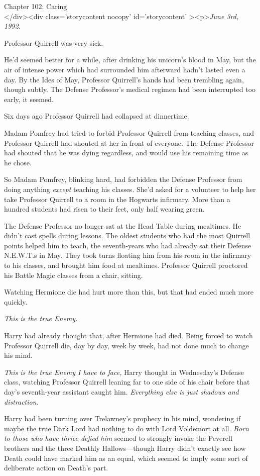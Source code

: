 
Chapter 102: Caring\\
</div><div  class='storycontent nocopy' id='storycontent' ><p>\emph{June 3rd, 1992.}

Professor Quirrell was very sick.

He'd seemed better for a while, after drinking his unicorn's blood in May, but the air of intense power which had surrounded him afterward hadn't lasted even a day. By the Ides of May, Professor Quirrell's hands had been trembling again, though subtly. The Defense Professor's medical regimen had been interrupted too early, it seemed.

Six days ago Professor Quirrell had collapsed at dinnertime.

Madam Pomfrey had tried to forbid Professor Quirrell from teaching classes, and Professor Quirrell had shouted at her in front of everyone. The Defense Professor had shouted that he was dying regardless, and would use his remaining time as he chose.

So Madam Pomfrey, blinking hard, had forbidden the Defense Professor from doing anything \emph{except} teaching his classes. She'd asked for a volunteer to help her take Professor Quirrell to a room in the Hogwarts infirmary. More than a hundred students had risen to their feet, only half wearing green.

The Defense Professor no longer sat at the Head Table during mealtimes. He didn't cast spells during lessons. The oldest students who had the most Quirrell points helped him to teach, the seventh-years who had already sat their Defense N.E.W.T.s in May. They took turns floating him from his room in the infirmary to his classes, and brought him food at mealtimes. Professor Quirrell proctored his Battle Magic classes from a chair, sitting.

Watching Hermione die had hurt more than this, but that had ended much more quickly.

\emph{This is the true Enemy.}

Harry had already thought that, after Hermione had died. Being forced to watch Professor Quirrell die, day by day, week by week, had not done much to change his mind.

\emph{This is the true Enemy I have to face,} Harry thought in Wednesday's Defense class, watching Professor Quirrell leaning far to one side of his chair before that day's seventh-year assistant caught him.\emph{ Everything else is just shadows and distraction.}

Harry had been turning over Trelawney's prophecy in his mind, wondering if maybe the true Dark Lord had nothing to do with Lord Voldemort at all. \emph{Born to those who have thrice defied him} seemed to strongly invoke the Peverell brothers and the three Deathly Hallows---though Harry didn't exactly see how Death could have marked him as an equal, which seemed to imply some sort of deliberate action on Death's part.

